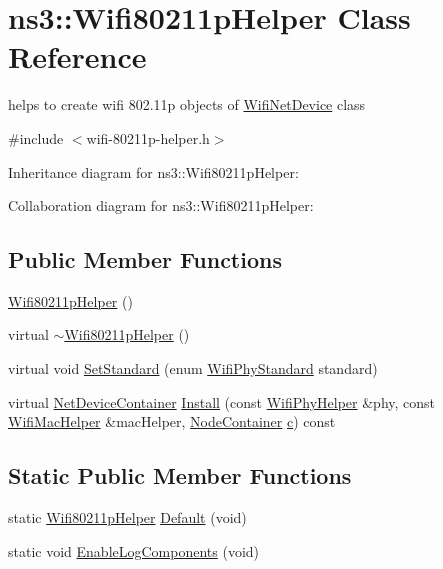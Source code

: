 \hypertarget{classns3_1_1Wifi80211pHelper}{}\section{ns3\+:\+:Wifi80211p\+Helper Class Reference}
\label{classns3_1_1Wifi80211pHelper}


helps to create wifi 802.\+11p objects of \hyperlink{classns3_1_1WifiNetDevice}{Wifi\+Net\+Device} class  




{\ttfamily \#include $<$wifi-\/80211p-\/helper.\+h$>$}



Inheritance diagram for ns3\+:\+:Wifi80211p\+Helper\+:


Collaboration diagram for ns3\+:\+:Wifi80211p\+Helper\+:
\subsection*{Public Member Functions}
\begin{DoxyCompactItemize}
\item 
\hyperlink{classns3_1_1Wifi80211pHelper_a8c4dbdb6e057a1547bce3d022ee894c2}{Wifi80211p\+Helper} ()
\item 
virtual \hyperlink{classns3_1_1Wifi80211pHelper_abe9e31730bdf9cfe197685040e7fe456}{$\sim$\+Wifi80211p\+Helper} ()
\item 
virtual void \hyperlink{classns3_1_1Wifi80211pHelper_a1c7f603fafd574f59ae68e239d184861}{Set\+Standard} (enum \hyperlink{group__wifi_ga1299834f4e1c615af3ca738033b76a49}{Wifi\+Phy\+Standard} standard)
\item 
virtual \hyperlink{classns3_1_1NetDeviceContainer}{Net\+Device\+Container} \hyperlink{classns3_1_1Wifi80211pHelper_a7c72c82947837e274fb09c36dec75d21}{Install} (const \hyperlink{classns3_1_1WifiPhyHelper}{Wifi\+Phy\+Helper} \&phy, const \hyperlink{classns3_1_1WifiMacHelper}{Wifi\+Mac\+Helper} \&mac\+Helper, \hyperlink{classns3_1_1NodeContainer}{Node\+Container} \hyperlink{mmwave_2model_2fading-traces_2fading__trace__generator_8m_ae0323a9039add2978bf5b49550572c7c}{c}) const 
\end{DoxyCompactItemize}
\subsection*{Static Public Member Functions}
\begin{DoxyCompactItemize}
\item 
static \hyperlink{classns3_1_1Wifi80211pHelper}{Wifi80211p\+Helper} \hyperlink{classns3_1_1Wifi80211pHelper_aa8681f4b0ae2b907697a4720c4177f0e}{Default} (void)
\item 
static void \hyperlink{classns3_1_1Wifi80211pHelper_a159fbdfa2402e78aebb00e7042ecfa08}{Enable\+Log\+Components} (void)
\end{DoxyCompactItemize}

